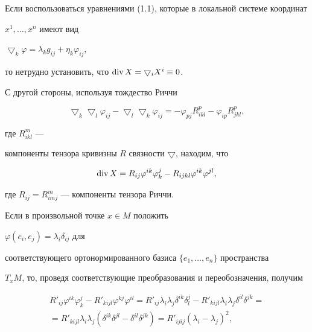 Если воспользоваться уравнениями (1.1), которые в локальной системе координат


$x^1,\dotsc,x^n$ имеют вид 


$\bigtriangledown_k \varphi=\lambda_k g_{ij}+\eta_k \varphi_{ij}$,


то нетрудно установить, что $\operatorname{div} X=\bigtriangledown_i X^i \equiv 0$.





С другой стороны, используя тождество Риччи


$$


\bigtriangledown_k\bigtriangledown_l\varphi_{ij}-


\bigtriangledown_l\bigtriangledown_k\varphi_{ij}=


-\varphi_{pj}R^p_{ikl}-\varphi_{ip}R^p_{jkl},


$$


где $R^m_{ikl}$ ---


компоненты тензора кривизны $R$ связности $\bigtriangledown$, находим, что


$$


\Div X=R_{ij}\varphi^{ik}\varphi^j_k-R_{ijkl}\varphi^{ik}\varphi^{jl},


$$


где $R_{ij}=R^m_{imj}$ --- компоненты тензора Риччи.





Если в произвольной точке $x\in M$ положить


$\varphi(e_i,e_j)=\lambda_i\delta_{ij}$ для 


соответствующего ортонормированного базиса $\{e_1,\dotsc,e_n\}$ пространства


$T_xM$, то, проведя соответствующие преобразования и переобозначения, получим


\begin{multline*}


R'_{ij}\varphi^{ik}\varphi^j_k-R'_{kijl}\varphi^{kj}\varphi^{il}=


R'_{ij}\lambda_i\lambda_j\delta^{ik}\delta^j_l-


R'_{kijl}\lambda_i\lambda_j\delta^{il}\delta^{jk}=\\


%


=R'_{kijl} \lambda_i \lambda_j (\delta^{ik}\delta^{jl}-


\delta^{il}\delta^{jk})=


R'_{ijij}(\lambda_i-\lambda_j)^2,


\end{multline*}



